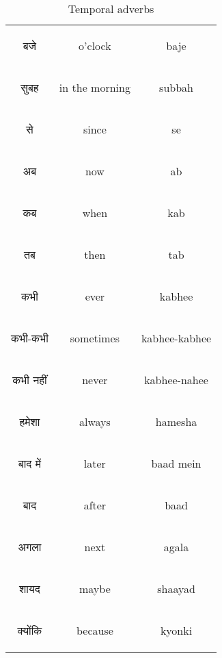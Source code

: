 \begin{table}[H]
    \centering
    \begin{tabular}{c|c|c}
\begin{hindi} बजे \end{hindi} & o'clock & baje \\  
\begin{hindi} सुबह \end{hindi} & in the morning & subbah \\  
\begin{hindi} से \end{hindi} & since & se \\  
\begin{hindi} अब \end{hindi} & now & ab \\  
\begin{hindi} कब \end{hindi} & when & kab \\  
\begin{hindi} तब \end{hindi} & then & tab \\  
\begin{hindi} कभी \end{hindi} & ever & kabhee \\  
\begin{hindi} कभी-कभी \end{hindi} & sometimes & kabhee-kabhee \\  
\begin{hindi} कभी नहीं\end{hindi} & never & kabhee-nahee \\  
\begin{hindi} हमेशा\end{hindi} & always & hamesha \\  
\begin{hindi} बाद में\end{hindi} & later & baad mein \\ 
\begin{hindi} बाद \end{hindi} & after & baad \\   
\begin{hindi} अगला \end{hindi} & next & agala \\   
\begin{hindi} शायद \end{hindi} & maybe & shaayad \\   
\begin{hindi} क्योंकि \end{hindi} & because & kyonki \\   
    \end{tabular}
    \caption{Temporal adverbs}
    \label{tab:adverbs_temporal}
\end{table}


